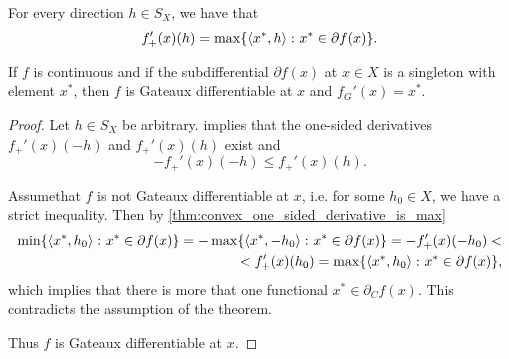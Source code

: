 \begin{proposition}
  \label{thm:convex_one_sided_derivative_is_max}
  For every direction \( h \in S_X \), we have that
  \begin{equation*}
    f_+'(x)(h) = \max\{ \left\langle x^*, h \right\rangle \colon x^* \in \partial f(x) \}.
  \end{equation*}
\end{proposition}

\begin{theorem}\label{thm:singleton_subdifferential_implies_gateaux}
  If \( f \) is continuous and if the subdifferential \( \partial f(x) \) at \( x \in X \) is a singleton with element \( x^* \), then \( f \) is Gateaux differentiable at \( x \) and \( f_G'(x) = x^* \).
\end{theorem}
\begin{proof}
  Let \( h \in S_X \) be arbitrary.  implies that the one-sided derivatives \( f_+'(x)(-h) \) and \( f_+'(x)(h) \) exist and
  \begin{equation*}
    -f_+'(x)(-h) \leq f_+'(x)(h).
  \end{equation*}

  Assume\LEM that \( f \) is not Gateaux differentiable at \( x \), i.e. for some \( h_0 \in X \), we have a strict inequality. Then by \cref{thm:convex_one_sided_derivative_is_max}
  \begin{align*}
    \min\{ \left\langle x^*, h_0 \right\rangle \colon x^* \in \partial f(x) \}
    =
    -\max\{ \left\langle x^*, -h_0 \right\rangle \colon x^* \in \partial f(x) \}
    =
    -f_+'(x)(-h_0)
    < \\ <
    f_+'(x)(h_0)
    =
    \max\{ \left\langle x^*, h_0 \right\rangle \colon x^* \in \partial f(x) \},
  \end{align*}
  which implies that there is more that one functional \( x^* \in \partial_C f(x) \). This contradicts the assumption of the theorem.

  Thus \( f \) is Gateaux differentiable at \( x \).
\end{proof}

